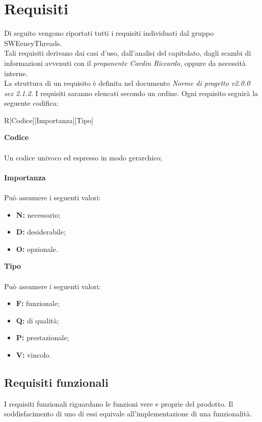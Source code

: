 \documentclass[a4paper]{article}
\begin{document}
	\newpage \section{Requisiti}
		Di seguito vengono riportati tutti i requisiti individuati dal gruppo SWEeneyThreads. \\Tali requisiti
		derivano dai casi d'uso, dall'analisi del capitolato, dagli scambi di informazioni avvenuti con il
		\emph{proponente Cardin Riccardo}, oppure da necessità interne. \\
		La struttura di un requisito è definita nel documento \emph{Norme di progetto v2.0.0 sez 2.1.2}.
		I requisiti saranno elencati secondo un ordine. Ogni requisito seguirà la seguente codifica: \\
		\begin{center}
			R[Codice][Importanza][Tipo]
		\end{center}
		\textbf{Codice} \\ \\ Un codice univoco ed espresso in modo gerarchico;\\ \\
		\textbf{Importanza} \\ \\Può assumere i seguenti valori:
		\begin{itemize}
			\item \textbf{N:} necessario;
			\item \textbf{D:} desiderabile;
			\item \textbf{O:} opzionale.
		\end{itemize}
		\textbf{Tipo} \\ \\Può assumere i seguenti valori:
		\begin{itemize}
			\item \textbf{F:} funzionale;
			\item \textbf{Q:} di qualità;
			\item \textbf{P:} prestazionale;
			\item \textbf{V:} vincolo.
		\end{itemize}
	
	\subsection{Requisiti funzionali}
	I requisiti funzionali riguardano le funzioni vere e proprie del prodotto. Il soddisfacimento di uno di essi
	equivale all'implementazione di una funzionalità.
\end{document}

